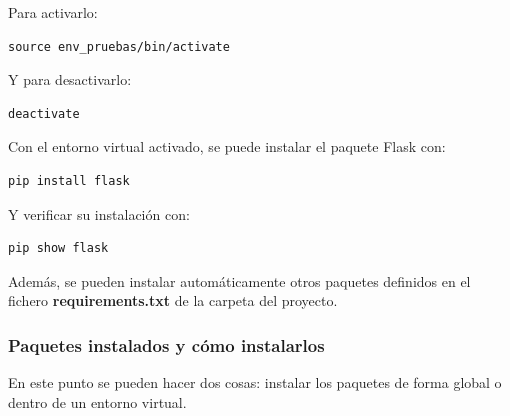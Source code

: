 \documentclass[10pt]{book}
\begin{document}
    Para activarlo:
    
    \begin{lstlisting}[style=simplebash]
    source env_pruebas/bin/activate
    \end{lstlisting}
    
    Y para desactivarlo:
    
    \begin{lstlisting}[style=simplebash]
    deactivate
    \end{lstlisting}
    
    Con el entorno virtual activado, se puede instalar el paquete Flask con:
    
    \begin{lstlisting}[style=simplebash]
    pip install flask
    \end{lstlisting}
    
    Y verificar su instalación con:
    
    \begin{lstlisting}[style=simplebash]
    pip show flask
    \end{lstlisting}
    
    Además, se pueden instalar automáticamente otros paquetes definidos en el fichero \textbf{requirements.txt} de la carpeta del proyecto.
    
    \subsubsection{Paquetes instalados y cómo instalarlos}
    
    En este punto se pueden hacer dos cosas: instalar los paquetes de forma global o dentro de un entorno virtual.
    
\end{document}
